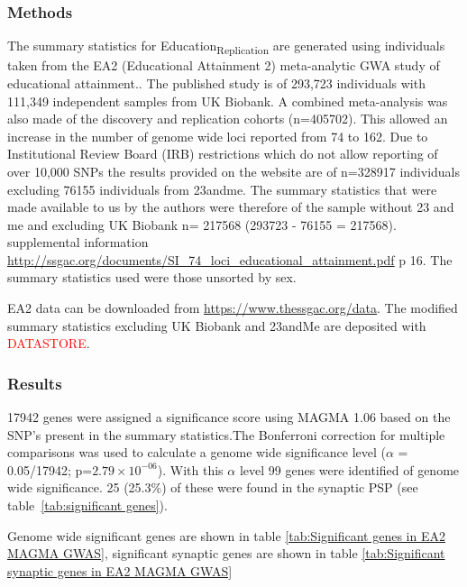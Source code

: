\subsubsection{Methods}
The summary statistics for Education\textsubscript{Replication} are generated using individuals taken from the EA2 (Educational Attainment 2) meta-analytic GWA study of educational attainment.\cite{okbay2016genome}.  The published study is of 293,723 individuals with 111,349 independent samples from UK Biobank. A combined meta-analysis was also made of the discovery and replication cohorts (n=405702). This allowed an increase in the number of genome wide loci reported from 74 to 162. Due to Institutional Review Board (IRB) restrictions which do not allow reporting of over 10,000 SNPs the results provided on the website are of n=328917 individuals excluding 76155 individuals from 23andme. The summary statistics that were made available to us by the authors were therefore of the sample without 23 and me and excluding UK Biobank n= 217568 (293723 - 76155 = 217568). \cite{okbay2016genome} supplemental information \url{http://ssgac.org/documents/SI_74_loci_educational_attainment.pdf} p 16. The summary statistics used were those unsorted by sex. 

EA2 data can be downloaded from \url{https://www.thessgac.org/data}. The modified summary statistics excluding UK Biobank and 23andMe  are deposited with \textcolor{red}{DATASTORE}.

\subsubsection{Results}

17942 genes were assigned a significance score using MAGMA 1.06 based on the SNP's present in the summary statistics.The Bonferroni correction for multiple comparisons was used to calculate a genome wide significance level ($\alpha$ = 0.05/17942; p=$2.79 \times 10^{-06}$). With this $\alpha$ level 99 genes were identified of genome wide significance. 25 (25.3\%) of these were found in the synaptic PSP (see table~\ref{tab:significant genes}).

Genome wide significant genes  are shown in table \ref{tab:Significant genes in EA2 MAGMA GWAS}, significant synaptic genes are shown in table \ref{tab:Significant synaptic genes in EA2  MAGMA GWAS}


